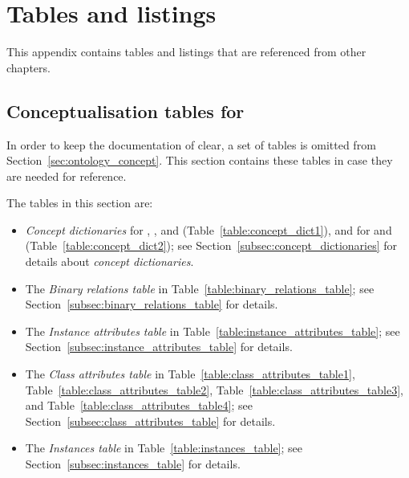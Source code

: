 \chapter{Tables and listings}
\label{ch:listings}

This appendix contains tables and listings that are referenced from other chapters.

\section{Conceptualisation tables for \smarthomeweather}
\label{sec:appendix_conceptualisation}

In order to keep the documentation of \smarthomeweather clear, a set of tables is omitted from Section~\ref{sec:ontology_concept}. This section contains these tables in case they are needed for reference.

The tables in this section are:

\begin{itemize}
  \item \emph{Concept dictionaries} for , , and  (Table~\ref{table:concept_dict1}), and for  and  (Table~\ref{table:concept_dict2}); see Section~\ref{subsec:concept_dictionaries} for details about \emph{concept dictionaries}.
  
  \item The \emph{Binary relations table} in Table~\ref{table:binary_relations_table}; see Section~\ref{subsec:binary_relations_table} for details.
  
  \item The \emph{Instance attributes table} in Table~\ref{table:instance_attributes_table}; see Section~\ref{subsec:instance_attributes_table} for details.
  
  \item The \emph{Class attributes table} in Table~\ref{table:class_attributes_table1}, Table~\ref{table:class_attributes_table2}, Table~\ref{table:class_attributes_table3}, and Table~\ref{table:class_attributes_table4}; see Section~\ref{subsec:class_attributes_table} for details.
  
  \item The \emph{Instances table} in Table~\ref{table:instances_table}; see Section~\ref{subsec:instances_table} for details.
\end{itemize}

